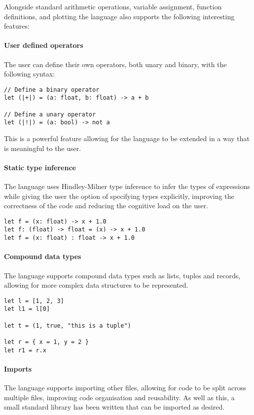 \usepackage{minted}Alongside standard arithmetic operations, variable assignment, function definitions, and plotting the language also 
supports the following interesting features:

\paragraph{User defined operators} The user can define their own operators, both unary and binary, with the 
following syntax:

\begin{verbatim}
// Define a binary operator
let (|+|) = (a: float, b: float) -> a + b

// Define a unary operator
let (|!|) = (a: bool) -> not a
\end{verbatim}

This is a powerful feature allowing for the language to be extended in a way that is meaningful to the user.

\paragraph{Static type inference} The language uses Hindley-Milner type inference to infer the types of
expressions while giving the user the option of specifying types explicitly, improving the correctness of the
code and reducing the cognitive load on the user.

\begin{verbatim}
let f = (x: float) -> x + 1.0
let f: (float) -> float = (x) -> x + 1.0
let f = (x: float) : float -> x + 1.0
\end{verbatim}

\paragraph{Compound data types} The language supports compound data types such as lists, tuples and records,
allowing for more complex data structures to be represented.

\begin{verbatim}
let l = [1, 2, 3]
let l1 = l[0]

let t = (1, true, "this is a tuple")

let r = { x = 1, y = 2 }
let r1 = r.x
\end{verbatim}

\paragraph{Imports} The language supports importing other files, allowing for code to be split across multiple
files, improving code organisation and reusability.
As well as this, a small standard library has been written that can be imported as desired.

